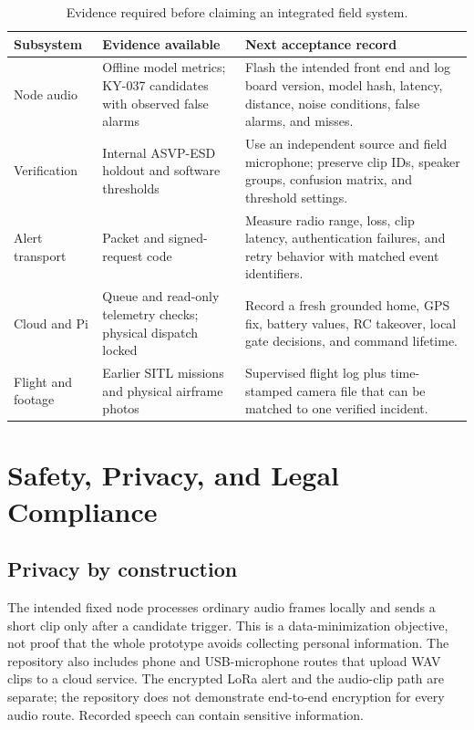 \documentclass[12pt,a4paper]{report}
\begin{document}
\begin{table}[htbp]
\centering\small
\caption{Evidence required before claiming an integrated field system.}
\label{tab:validationplan}
\begin{tabular}{|>{\raggedright\arraybackslash}p{}|>{\raggedright\arraybackslash}p{}|>{\raggedright\arraybackslash}p{}|}
\hline
\textbf{Subsystem} & \textbf{Evidence available} & \textbf{Next acceptance record}\\\hline
Node audio & Offline model metrics; KY-037 candidates with observed false alarms & Flash the intended front end and log board version, model hash, latency, distance, noise conditions, false alarms, and misses.\\\hline
Verification & Internal ASVP-ESD holdout and software thresholds & Use an independent source and field microphone; preserve clip IDs, speaker groups, confusion matrix, and threshold settings.\\\hline
Alert transport & Packet and signed-request code & Measure radio range, loss, clip latency, authentication failures, and retry behavior with matched event identifiers.\\\hline
Cloud and Pi & Queue and read-only telemetry checks; physical dispatch locked & Record a fresh grounded home, GPS fix, battery values, RC takeover, local gate decisions, and command lifetime.\\\hline
Flight and footage & Earlier SITL missions and physical airframe photos & Supervised flight log plus time-stamped camera file that can be matched to one verified incident.\\\hline
\end{tabular}
\end{table}


\section{Safety, Privacy, and Legal Compliance}
\label{ch:compliance}

\subsection{Privacy by construction}
\label{sec:privacy}
The intended fixed node processes ordinary audio frames locally and
sends a short clip only after a candidate trigger. This is a
data-minimization objective, not proof that the whole prototype avoids
collecting personal information. The repository also includes phone
and USB-microphone routes that upload WAV clips to a cloud service.
The encrypted LoRa alert and the audio-clip path are separate; the
repository does not demonstrate end-to-end encryption for every audio
route. Recorded speech can contain sensitive information.
\end{document}
